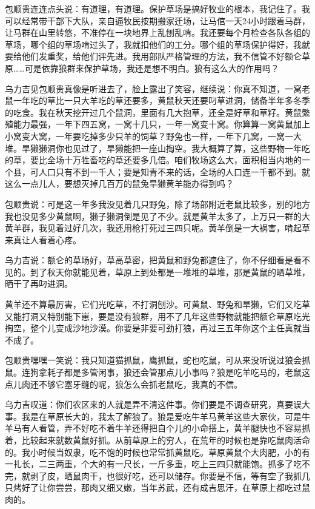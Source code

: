 \par 包顺贵连连点头说：有道理，有道理。保护草场是搞好牧业的根本，我记住了。我可以经常带干部下大队，亲自逼牧民按期搬家迁场，让马倌一天24小时跟着马群，让马群在山里转悠，不准停在一块地界上乱刨乱啃。我还要每个月检查各队各组的草场，哪个组的草场啃过头了，我就扣他们的工分。哪个组的草场保护得好，我就要给他们发重奖，给他们评先进。我用部队严格管理的方法，我不信管不好额仑草原……可是依靠狼群来保护草场，我还是想不明白。狼有这么大的作用吗？
\par 乌力吉见包顺贵真像是听进去了，脸上露出了笑容，继续说：你真不知道，一窝老鼠一年吃的草比一只大羊吃的草还要多，黄鼠秋天还要叼草进洞，储备半年多冬季的吃食。我在秋天挖开过几个鼠洞，里面有几大抱草，还全是好草和草籽。黄鼠繁殖能力最强，一年下四五窝，一窝十几只，一年一窝变十窝。你算算一窝黄鼠加上小窝变大窝，一年要吃掉多少只羊的饲草？野兔也一样，一年下几窝，一窝一大堆。旱獭獭洞你也见过了，旱獭能把一座山掏空。我大概算了算，这些野物一年吃的草，要比全场十万牲畜吃的草还要多几倍。咱们牧场这么大，面积相当内地的一个县，可人口只有不到一千人；要是知青不来的话，全场的人口连一千都不到。就这么一点儿人，要想灭掉几百万的鼠兔旱獭黄羊能办得到吗？
\par 包顺贵说：可是这一年多我没见着几只野兔，除了场部附近老鼠比较多，别的地方我也没见多少黄鼠啊，獭子獭洞倒是见了不少。就是黄羊太多了，上万只一群的大黄羊群，我见着过好几次，我还用枪打死过三四只呢。黄羊倒是一大祸害，啃起草来真让人看着心疼。
\par 乌力吉说：额仑的草场好，草高草密，把黄鼠和野兔都遮住了，你不仔细看是看不见的。到了秋天你就能见着，草原上到处都是一堆堆的草堆，那是黄鼠的晒草堆，晒干了再叼进洞。
\par 黄羊还不算最厉害，它们光吃草，不打洞刨沙。可黄鼠、野兔和旱獭，它们又吃草又能打洞又特别能下崽，要是没有狼群，用不了几年这些野物就能把额仑草原吃光掏空，整个儿变成沙地沙漠。你要是非要可劲打狼，再过三五年你这个主任真就当不成了。
\par 包顺贵嘿嘿一笑说：我只知道猫抓鼠，鹰抓鼠，蛇也吃鼠，可从来没听说过狼会抓鼠。连狗拿耗子都是多管闲事，狼还会管那点儿小事吗？狼是吃羊吃马的，老鼠这点儿肉还不够它塞牙缝的呢，狼怎么会抓老鼠吃，我真的不信。
\par 乌力吉叹道：你们农区来的人就是弄不清这件事。你们要是不调查研究，真要误大事。我是在草原长大的，我太了解狼了。狼是爱吃牛羊马黄羊这些大家伙，可是牛羊马有人看管，弄不好吃不着牛羊还得把自个儿的小命搭上，黄羊腿快也不容易抓着，比较起来就数黄鼠好抓。从前草原上的穷人，在荒年的时候也是靠吃鼠肉活命的。我小时候当奴隶，吃不饱的时候也常常抓黄鼠吃。草原黄鼠个大肉肥，小的有一扎长，二三两重，个大的有一尺长，一斤多重，吃上三四只就能饱。抓多了吃不完，就剥了皮，晒鼠肉干，也很好吃，还可以储存。你要是不信，等有空了我抓几只烤好了让你尝尝，那肉又细又嫩，当年苏武，还有成吉思汗，在草原上都吃过鼠肉的。
